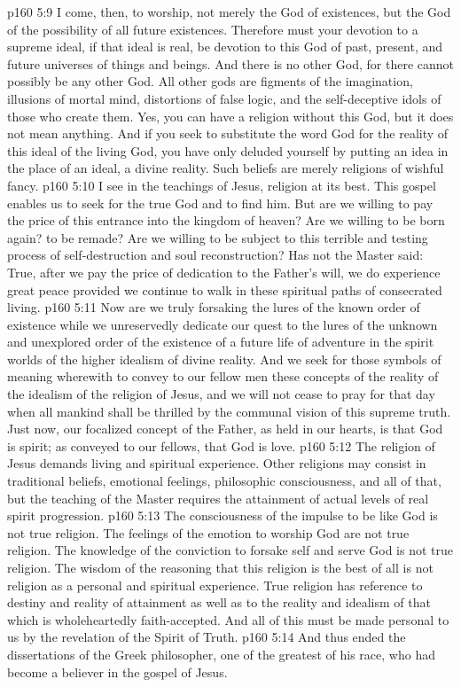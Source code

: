 \vs p160 5:9 I come, then, to worship, not merely the God of existences, but the God of the possibility of all future existences. Therefore must your devotion to a supreme ideal, if that ideal is real, be devotion to this God of past, present, and future universes of things and beings. And there is no other God, for there cannot possibly be any other God. All other gods are figments of the imagination, illusions of mortal mind, distortions of false logic, and the self\hyp{}deceptive idols of those who create them. Yes, you can have a religion without this God, but it does not mean anything. And if you seek to substitute the word God for the reality of this ideal of the living God, you have only deluded yourself by putting an idea in the place of an ideal, a divine reality. Such beliefs are merely religions of wishful fancy.
\vs p160 5:10 I see in the teachings of Jesus, religion at its best. This gospel enables us to seek for the true God and to find him. But are we willing to pay the price of this entrance into the kingdom of heaven? Are we willing to be born again? to be remade? Are we willing to be subject to this terrible and testing process of self\hyp{}destruction and soul reconstruction? Has not the Master said:  True, after we pay the price of dedication to the Father’s will, we do experience great peace provided we continue to walk in these spiritual paths of consecrated living.
\vs p160 5:11 Now are we truly forsaking the lures of the known order of existence while we unreservedly dedicate our quest to the lures of the unknown and unexplored order of the existence of a future life of adventure in the spirit worlds of the higher idealism of divine reality. And we seek for those symbols of meaning wherewith to convey to our fellow men these concepts of the reality of the idealism of the religion of Jesus, and we will not cease to pray for that day when all mankind shall be thrilled by the communal vision of this supreme truth. Just now, our focalized concept of the Father, as held in our hearts, is that God is spirit; as conveyed to our fellows, that God is love.
\vs p160 5:12 The religion of Jesus demands living and spiritual experience. Other religions may consist in traditional beliefs, emotional feelings, philosophic consciousness, and all of that, but the teaching of the Master requires the attainment of actual levels of real spirit progression.
\vs p160 5:13 The consciousness of the impulse to be like God is not true religion. The feelings of the emotion to worship God are not true religion. The knowledge of the conviction to forsake self and serve God is not true religion. The wisdom of the reasoning that this religion is the best of all is not religion as a personal and spiritual experience. True religion has reference to destiny and reality of attainment as well as to the reality and idealism of that which is wholeheartedly faith\hyp{}accepted. And all of this must be made personal to us by the revelation of the Spirit of Truth.
\vs p160 5:14 \pc And thus ended the dissertations of the Greek philosopher, one of the greatest of his race, who had become a believer in the gospel of Jesus.
